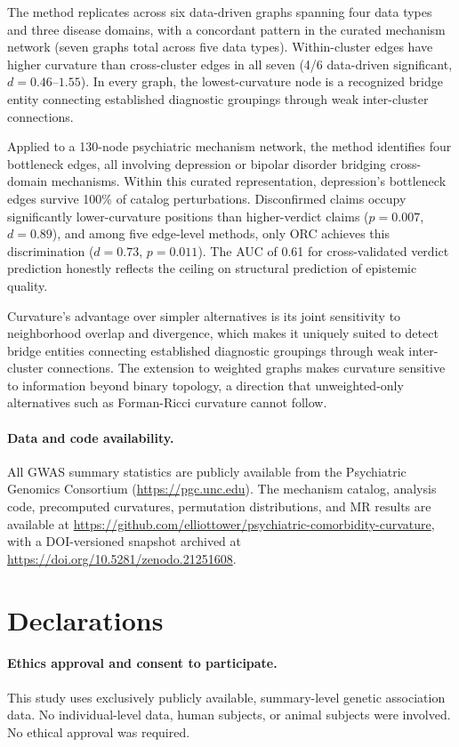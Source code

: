 \documentclass[11pt]{article}
\begin{document}
The method replicates across six data-driven graphs spanning four data types and three disease domains, with a concordant pattern in the curated mechanism network (seven graphs total across five data types). Within-cluster edges have higher curvature than cross-cluster edges in all seven (4/6 data-driven significant, $d = 0.46$--$1.55$). In every graph, the lowest-curvature node is a recognized bridge entity connecting established diagnostic groupings through weak inter-cluster connections.

Applied to a 130-node psychiatric mechanism network, the method identifies four bottleneck edges, all involving depression or bipolar disorder bridging cross-domain mechanisms. Within this curated representation, depression's bottleneck edges survive 100\% of catalog perturbations. Disconfirmed claims occupy significantly lower-curvature positions than higher-verdict claims ($p = 0.007$, $d = 0.89$), and among five edge-level methods, only ORC achieves this discrimination ($d = 0.73$, $p = 0.011$). The AUC of 0.61 for cross-validated verdict prediction honestly reflects the ceiling on structural prediction of epistemic quality.

Curvature's advantage over simpler alternatives is its joint sensitivity to neighborhood overlap and divergence, which makes it uniquely suited to detect bridge entities connecting established diagnostic groupings through weak inter-cluster connections. The extension to weighted graphs makes curvature sensitive to information beyond binary topology, a direction that unweighted-only alternatives such as Forman-Ricci curvature \citep{sreejith2016forman} cannot follow.

\paragraph{Data and code availability.} All GWAS summary statistics are publicly available from the Psychiatric Genomics Consortium (\url{https://pgc.unc.edu}). The mechanism catalog, analysis code, precomputed curvatures, permutation distributions, and MR results are available at \url{https://github.com/elliottower/psychiatric-comorbidity-curvature}, with a DOI-versioned snapshot archived at \url{https://doi.org/10.5281/zenodo.21251608}.

\section*{Declarations}

\paragraph{Ethics approval and consent to participate.}
This study uses exclusively publicly available, summary-level genetic association data. No individual-level data, human subjects, or animal subjects were involved. No ethical approval was required.
\end{document}

